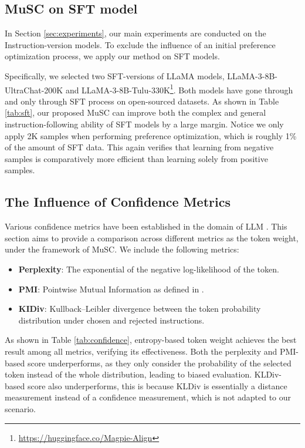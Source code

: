 \subsection{MuSC on SFT model}
In Section \ref{sec:experiments}, our main experiments are conducted on the Instruction-version models. To exclude the influence of an initial preference optimization process, we apply our method on SFT models.

Specifically, we selected two SFT-versions of LLaMA models, LLaMA-3-8B-UltraChat-200K and LLaMA-3-8B-Tulu-330K\footnote{\url{https://huggingface.co/Magpie-Align}}. Both models have gone through and only through SFT process on open-sourced datasets. As shown in Table \ref{tab:sft}, our proposed MuSC can improve both the complex and general instruction-following ability of SFT models by a large margin. Notice we only apply 2K samples when performing preference optimization, which is roughly 1\% of the amount of SFT data. This again verifies that learning from negative samples is comparatively more efficient than learning solely from positive samples.

\subsection{The Influence of Confidence Metrics}

Various confidence metrics have been established in the domain of LLM \cite{geng-etal-2024-confidence-survey}. This section aims to provide a comparison across different metrics as the token weight, under the framework of MuSC. We include the following metrics:

\vspace{-2mm}

\begin{itemize}[itemsep=1mm, parsep=0pt]
    \item \textbf{Perplexity}: The exponential of the negative log-likelihood of the token.
    \item \textbf{PMI}: Pointwise Mutual Information as defined in \citet{takayama-arase-2019-relevant}. 
    \item \textbf{KIDiv}: Kullback–Leibler divergence between the token probability distribution under chosen and rejected instructions.
\end{itemize}

\vspace{-2mm}

As shown in Table \ref{tab:confidence}, entropy-based token weight achieves the best result among all metrics, verifying its effectiveness. Both the perplexity and PMI-based score underperforms, as they only consider the probability of the selected token instead of the whole distribution, leading to biased evaluation. KLDiv-based score also underperforms, this is because KLDiv is essentially a distance measurement instead of a confidence measurement, which is not adapted to our scenario.

